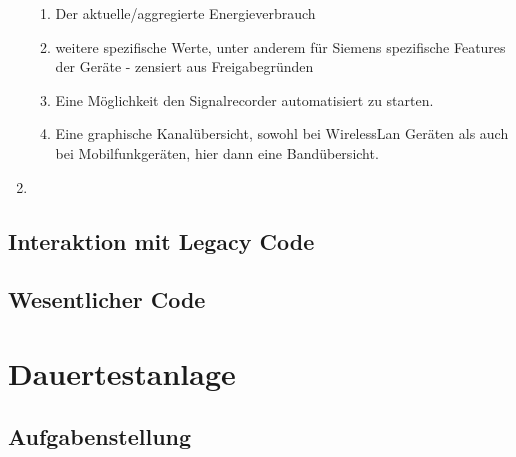 \begin{enumerate}
\begin{enumerate}
                        \item Der aktuelle/aggregierte Energieverbrauch
                        \item weitere spezifische Werte, unter anderem für Siemens spezifische Features der Geräte - zensiert aus Freigabegründen
                        \item Eine Möglichkeit den Signalrecorder automatisiert zu starten.
                        \item Eine graphische Kanalübersicht, sowohl bei WirelessLan Geräten als auch bei Mobilfunkgeräten, hier dann eine Bandübersicht.
                \end{enumerate}
        \item 
\end{enumerate}
\subsection{Interaktion mit Legacy Code}
\subsection{Wesentlicher Code}

\section{Dauertestanlage}
\subsection{Aufgabenstellung}
